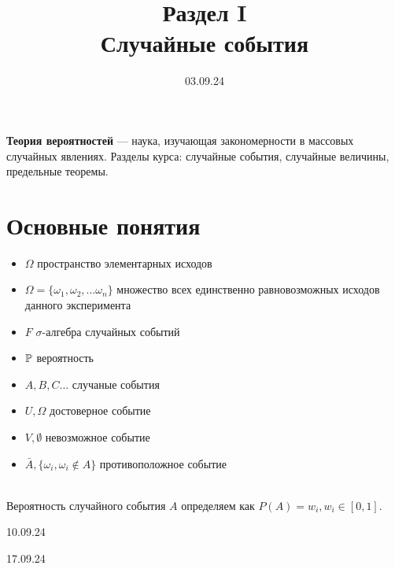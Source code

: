 

\title{Раздел I \\
       Случайные события}
\date{03.09.24}


    \maketitle
    
    \textbf{Теория вероятностей} — наука, изучающая закономерности 
    в массовых случайных явлениях. Разделы курса: случайные события, случайные 
    величины, предельные теоремы.

    \section{Основные понятия}

    \begin{itemize}
        \item \(\Omega\) пространство элементарных исходов 
        \item \(\Omega = \{\omega_1, \omega_2, ... \omega_n\}\)
        множество всех единственно равновозможных исходов данного эксперимента
        \item \(F\) \(\sigma\)-алгебра случайных событий
        \item \(\mathbb{P}\) вероятность
        \\
        \item \(A, B, C\dots\) случаные события
        \item \(U, \Omega\) достоверное событие
        \item \(V, \emptyset\) невозможное событие
        \item \(\bar A, \{\omega_i, \omega_i \notin A\}\) противоположное событие
    \end{itemize}
    \\
    Вероятность случайного события \(A\) определяем как \(P(A) = w_i, w_i \in [0,1]\).
    


    \vspace{2cm}
    \centering\large{10.09.24}



    \vspace{2cm}
    \centering\large{17.09.24}

